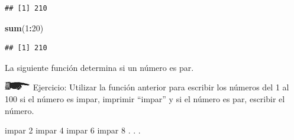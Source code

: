 \documentclass[]{book}
\newenvironment{Shaded}{\begin{snugshade}}{\end{snugshade}}
\newcommand{\KeywordTok}[1]{\textcolor[rgb]{0.13,0.29,0.53}{\textbf{#1}}}
\newcommand{\DataTypeTok}[1]{\textcolor[rgb]{0.13,0.29,0.53}{#1}}
\newcommand{\DecValTok}[1]{\textcolor[rgb]{0.00,0.00,0.81}{#1}}
\newcommand{\StringTok}[1]{\textcolor[rgb]{0.31,0.60,0.02}{#1}}
\newcommand{\ControlFlowTok}[1]{\textcolor[rgb]{0.13,0.29,0.53}{\textbf{#1}}}
\newcommand{\OperatorTok}[1]{\textcolor[rgb]{0.81,0.36,0.00}{\textbf{#1}}}
\newcommand{\NormalTok}[1]{#1}
\theoremstyle{definition}
\theoremstyle{definition}
\theoremstyle{definition}
\theoremstyle{remark}
\begin{document}
\begin{verbatim}
## [1] 210
\end{verbatim}

\begin{Shaded}
\begin{Highlighting}[]
\KeywordTok{sum}\NormalTok{(}\DecValTok{1}\OperatorTok{:}\DecValTok{20}\NormalTok{)}
\end{Highlighting}
\end{Shaded}

\begin{verbatim}
## [1] 210
\end{verbatim}

La siguiente función determina si un número es par.

\begin{Shaded}
\end{Shaded}

\includegraphics{./imagenes/manicule2.jpg} Ejercicio: Utilizar la
función anterior para escribir los números del 1 al 100 si el número es
impar, imprimir ``impar'' y si el número es par, escribir el número.

\begin{Shaded}
\begin{Highlighting}[]
\NormalTok{impar}
\DecValTok{2}
\NormalTok{impar}
\DecValTok{4}
\NormalTok{impar}
\DecValTok{6}
\NormalTok{impar}
\DecValTok{8}
\NormalTok{.}
\NormalTok{.}
\NormalTok{.}
\end{Highlighting}
\end{Shaded}

\begin{Shaded}
\end{Shaded}
\end{document}
